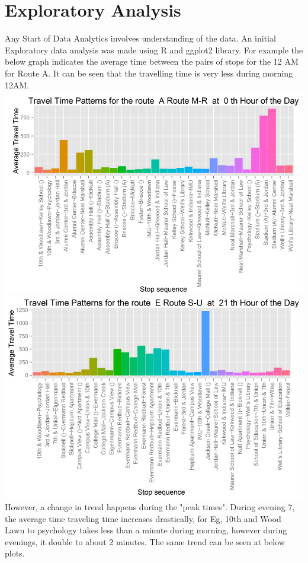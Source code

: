 \documentclass[12pt]{article}
\begin{document}
\section{Exploratory Analysis}
Any Start of Data Analytics involves understanding of the data. An initial Exploratory data analysis was made using R and ggplot2 library. For example the below graph indicates the average time between the pairs of stops for the 12 AM for Route A. It can be seen that the travelling time is very less during morning 12AM. \\
\includegraphics[scale=0.4]{resources/ggplot1}\\[1cm] 
\includegraphics[scale=0.4]{resources/ggplot2}\\[1cm] 
However, a change in trend happens during the "peak times". During evening 7, the average time traveling time increases drastically, for Eg, 10th and Wood Lawn to psychology takes less than a minute during morning, however during evenings, it double to about 2 minutes. The same trend can be seen at below plots. \\
\end{document}
